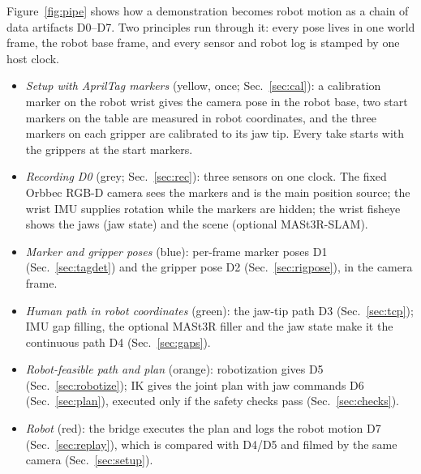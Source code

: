 \documentclass[conference,10pt]{IEEEtran}
\begin{document}
Figure~\ref{fig:pipe} shows how a demonstration becomes robot motion as a chain of data artifacts D0--D7. Two principles
run through it: every pose lives in one world frame, the robot base frame, and every sensor and robot log is stamped by
one host clock.
\begin{itemize}
\item \emph{Setup with AprilTag markers} (yellow, once; Sec.~\ref{sec:cal}): a calibration marker on the robot wrist gives
  the camera pose in the robot base, two start markers on the table are measured in robot coordinates, and the three
  markers on each gripper are calibrated to its jaw tip. Every take starts with the grippers at the start markers.
\item \emph{Recording D0} (grey; Sec.~\ref{sec:rec}): three sensors on one clock. The fixed Orbbec RGB-D camera sees the
  markers and is the main position source; the wrist IMU supplies rotation while the markers are hidden; the wrist fisheye
  shows the jaws (jaw state) and the scene (optional MASt3R-SLAM).
\item \emph{Marker and gripper poses} (blue): per-frame marker poses D1 (Sec.~\ref{sec:tagdet}) and the gripper pose D2
  (Sec.~\ref{sec:rigpose}), in the camera frame.
\item \emph{Human path in robot coordinates} (green): the jaw-tip path D3 (Sec.~\ref{sec:tcp}); IMU gap filling, the
  optional MASt3R filler and the jaw state make it the continuous path D4 (Sec.~\ref{sec:gaps}).
\item \emph{Robot-feasible path and plan} (orange): robotization gives D5 (Sec.~\ref{sec:robotize}); IK gives the joint
  plan with jaw commands D6 (Sec.~\ref{sec:plan}), executed only if the safety checks pass (Sec.~\ref{sec:checks}).
\item \emph{Robot} (red): the bridge executes the plan and logs the robot motion D7 (Sec.~\ref{sec:replay}), which is
  compared with D4/D5 and filmed by the same camera (Sec.~\ref{sec:setup}).
\end{itemize}

\end{document}
